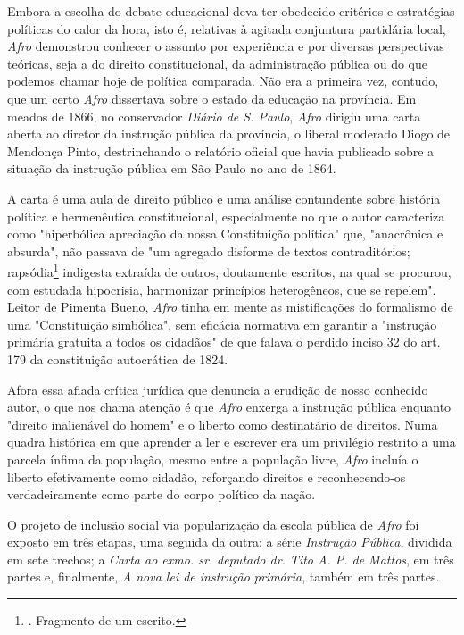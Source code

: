 Embora a escolha do debate educacional deva ter obedecido critérios e
estratégias políticas do calor da hora, isto é, relativas à agitada
conjuntura partidária local, \emph{Afro} demonstrou conhecer o assunto
por experiência e por diversas perspectivas teóricas, seja a do direito
constitucional, da administração pública ou do que podemos chamar hoje
de política comparada. Não era a primeira vez, contudo, que um certo
\emph{Afro} dissertava sobre o estado da educação na província. Em
meados de 1866, no conservador \emph{Diário de S. Paulo}, \emph{Afro}
dirigiu uma carta aberta ao diretor da instrução pública da província, o
liberal moderado Diogo de Mendonça Pinto, destrinchando o relatório
oficial que havia publicado sobre a situação da instrução pública em São
Paulo no ano de 1864.

A carta é uma aula de direito público e uma análise contundente sobre
história política e hermenêutica constitucional, especialmente no que o
autor caracteriza como "hiperbólica apreciação da nossa Constituição
política" que, "anacrônica e absurda", não passava de "um agregado
disforme de textos contraditórios; rapsódia\footnote{. Fragmento de um
  escrito.} indigesta extraída de outros, doutamente escritos, na qual
se procurou, com estudada hipocrisia, harmonizar princípios
heterogêneos, que se repelem". Leitor de Pimenta Bueno, \emph{Afro}
tinha em mente as mistificações do formalismo de uma "Constituição
simbólica", sem eficácia normativa em garantir a "instrução primária
gratuita a todos os cidadãos" de que falava o perdido inciso 32 do art.
179 da constituição autocrática de 1824.

Afora essa afiada crítica jurídica que denuncia a erudição de nosso
conhecido autor, o que nos chama atenção é que \emph{Afro} enxerga a
instrução pública enquanto "direito inalienável do homem" e o liberto
como destinatário de direitos. Numa quadra histórica em que aprender a
ler e escrever era um privilégio restrito a uma parcela ínfima da
população, mesmo entre a população livre, \emph{Afro} incluía o liberto
efetivamente como cidadão, reforçando direitos e reconhecendo-os
verdadeiramente como parte do corpo político da nação.

O projeto de inclusão social via popularização da escola pública de
\emph{Afro} foi exposto em três etapas, uma seguida da outra: a série
\emph{Instrução Pública}, dividida em sete trechos; a \emph{Carta ao
exmo. sr. deputado dr. Tito A. P. de Mattos}, em três partes e,
finalmente, \emph{A nova lei de instrução primária}, também em três
partes.

